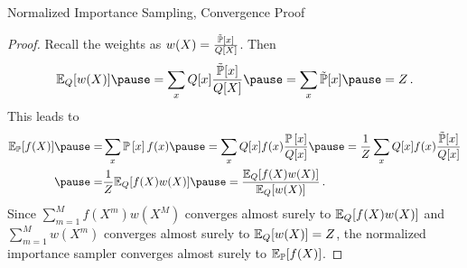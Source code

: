 \begin{frame}{Normalized Importance Sampling, Convergence Proof}
\begin{proof}
Recall the weights as $w(X) = \frac{\tilde{\Pb}[x]}{Q[X]}$.
\pause
Then 
\begin{equation}
    \E_{Q}[w(X)] 
    \pause = \sum_x Q[x] \frac{\tilde{\Pb}[x]}{Q[X]} 
    \pause = \sum_x \tilde{\Pb}[x] 
    \pause = Z\,.
\end{equation}
\pause
This leads to
\begin{equation}
    \begin{aligned}
\E_{\Pb}[f(X)] 
\pause = & \sum_x \Pb[x] f(x) 
\pause = \sum_x Q[x] f(x) \frac{\Pb[x]}{Q[x]} 
\pause = \frac{1}{Z} \sum_x Q[x] f(x)  \frac{\tilde{\Pb}[x]}{Q[x]} \\
\pause = & \frac{1}{Z} \E_{Q}[f(X) w(X)] 
\pause = \frac{\E_Q[f(X) w(X)]}{\E_Q[w(X)]}\,.
    \end{aligned}
\end{equation}
\pause
Since $\sum_{m=1}^M f(X^m) w(X^M)$ converges almost surely to $\E_Q[f(X) w(X)]$ and $\sum_{m=1}^M w(X^m)$ converges almost surely to $\E_Q[w(X)] = Z$, the normalized importance sampler converges almost surely to $\E_{\Pb}[f(X)]$.
\end{proof}
\end{frame}


